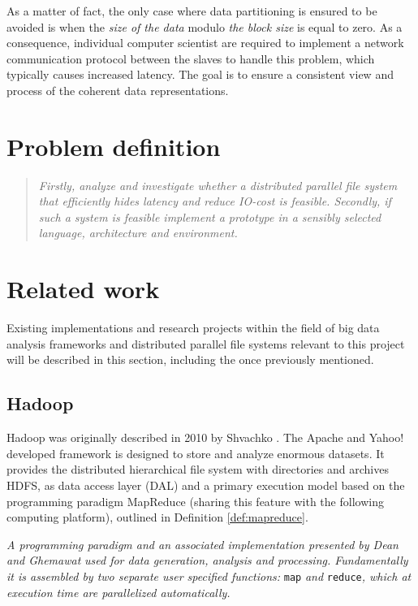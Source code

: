 As a matter of fact, the only case where data partitioning is ensured to be avoided is when the \textit{size of the data} modulo \textit{the block size} is equal to zero. As a consequence, individual computer scientist are required to implement a network communication protocol between the slaves to handle this problem, which typically causes increased latency. The goal is to ensure a consistent view and process of the coherent data representations.

\section{Problem definition} \label{sec:problem}
\begin{quotation}
\hspace*{-7mm}
\textit{Firstly, analyze and investigate whether a distributed parallel file system that efficiently hides latency and reduce IO-cost is feasible. Secondly, if such a system is feasible implement a prototype in a sensibly selected language, architecture and environment.} \newline
\end{quotation}

\section{Related work} \label{sec:related}
Existing implementations and research projects within the field of big data analysis frameworks and distributed parallel file systems relevant to this project will be described in this section, including the once previously mentioned.

\subsection*{Hadoop}
Hadoop was originally described in 2010 by Shvachko \etal \cite{Shvachko:2010:HDF:1913798.1914427}. The Apache and Yahoo! developed framework is designed to store and analyze enormous datasets. It provides the distributed hierarchical file system with directories and archives HDFS, as data access layer (DAL) and a primary execution model based on the programming paradigm MapReduce (sharing this feature with the following computing platform), outlined in Definition \ref{def:mapreduce}.
\vspace*{2mm}

\begin{definition}[MapReduce] \label{def:mapreduce}
\textit{A programming paradigm and an associated implementation presented by Dean and Ghemawat} \cite{Dean:2008:MSD:1327452.1327492} \textit{used for data generation, analysis and processing. Fundamentally it is assembled by two separate user specified functions:} \texttt{map} \textit{and} \texttt{reduce}\textit{, which at execution time are parallelized automatically.}
\end{definition}
\vspace*{2mm}

